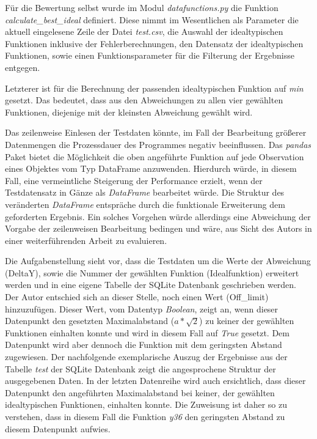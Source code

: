 Für die Bewertung selbst wurde im Modul \emph{datafunctions.py} die Funktion \emph{calculate\_best\_ideal} definiert. Diese nimmt im Wesentlichen als Parameter die aktuell eingelesene Zeile der Datei \emph{test.csv}, die Auswahl der idealtypischen Funktionen inklusive der Fehlerberechnungen, den Datensatz der idealtypischen Funktionen, sowie einen Funktionsparameter für die Filterung der Ergebnisse entgegen. 

Letzterer ist für die Berechnung der passenden idealtypischen Funktion auf \emph{min} gesetzt. Das bedeutet, dass aus den Abweichungen zu allen vier gewählten Funktionen, diejenige mit der kleinsten Abweichung gewählt wird.

Das zeilenweise Einlesen der Testdaten könnte, im Fall der Bearbeitung größerer Datenmengen die Prozessdauer des Programmes negativ beeinflussen. Das \emph{pandas} Paket bietet die Möglichkeit die oben angeführte Funktion auf jede Observation eines Objektes vom Typ DataFrame anzuwenden. Hierdurch würde, in diesem Fall, eine vermeintliche Steigerung der Performance erzielt, wenn der Testdatensatz in Gänze als \emph{DataFrame} bearbeitet würde. Die Struktur des veränderten \emph{DataFrame} entspräche durch die funktionale Erweiterung dem geforderten Ergebnis. Ein solches Vorgehen würde allerdings eine Abweichung der Vorgabe der zeilenweisen Bearbeitung bedingen und wäre, aus Sicht des Autors in einer weiterführenden Arbeit zu evaluieren.   

Die Aufgabenstellung sieht vor, dass die Testdaten um die Werte der Abweichung (DeltaY), sowie die Nummer der gewählten Funktion (Idealfunktion) erweitert werden und in eine eigene Tabelle der SQLite Datenbank geschrieben werden. Der Autor entschied sich an dieser Stelle, noch einen Wert (Off\_limit) hinzuzufügen. Dieser Wert, vom Datentyp \emph{Boolean}, zeigt an, wenn dieser Datenpunkt den gesetzten Maximalabstand ($a*\sqrt{2}$) zu keiner der gewählten Funktionen einhalten konnte und wird in diesem Fall auf \emph{True} gesetzt. Dem Datenpunkt wird aber dennoch die Funktion mit dem geringsten Abstand zugewiesen. Der nachfolgende exemplarische Auszug der Ergebnisse aus der Tabelle \emph{test} der SQLite Datenbank zeigt die angesprochene Struktur der ausgegebenen Daten. In der letzten Datenreihe wird auch ersichtlich, dass dieser Datenpunkt den angeführten Maximalabstand bei keiner, der gewählten idealtypischen Funktionen, einhalten konnte. Die Zuweisung ist daher so zu verstehen, dass in diesem Fall die Funktion \emph{y36} den geringsten Abstand zu diesem Datenpunkt aufwies.

